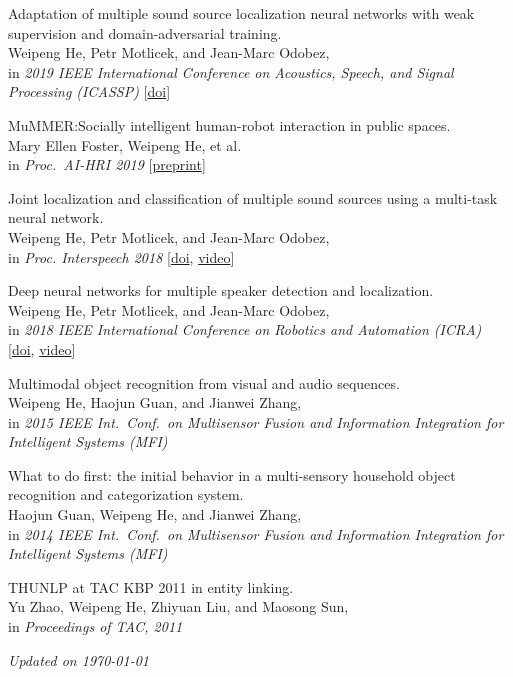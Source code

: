 \documentclass[a4paper,9pt]{extarticle} %
\begin{document}
\begin{enumerate}[label={[\arabic*]}]
  \item Adaptation of multiple sound source localization neural networks with weak supervision and domain-adversarial training. \\
        Weipeng He, Petr Motlicek, and Jean-Marc Odobez, \\
        in \textit{2019 IEEE International Conference on Acoustics, Speech, and Signal Processing (ICASSP)}
        [\href{https://doi.org/10.1109/ICASSP.2019.8682655}{doi}]

  \item MuMMER:\@ Socially intelligent human-robot interaction in public spaces. \\
        Mary Ellen Foster, Weipeng He, et al. \\
        in \textit{Proc.\ AI-HRI 2019}
        [\href{https://arxiv.org/abs/1909.06749}{preprint}]

  \item Joint localization and classification of multiple sound sources using a multi-task neural network. \\
        Weipeng He, Petr Motlicek, and Jean-Marc Odobez, \\
        in \textit{Proc. Interspeech 2018}
        [\href{http://doi.org/10.21437/Interspeech.2018-1269}{doi}, \href{https://www.youtube.com/watch?v=O7bQvg03RTc}{video}]

  \item Deep neural networks for multiple speaker detection and localization. \\
        Weipeng He, Petr Motlicek, and Jean-Marc Odobez, \\
        in \textit{2018 IEEE International Conference on Robotics and Automation (ICRA)}
        [\href{http://doi.org/10.1109/ICRA.2018.8461267}{doi}, \href{https://www.youtube.com/watch?v=_4EwuVlE_pU}{video}]

  \item Multimodal object recognition from visual and audio sequences. \\
        Weipeng He, Haojun Guan, and Jianwei Zhang, \\
        in \textit{2015 IEEE Int.\ Conf.\ on Multisensor Fusion and Information Integration for Intelligent Systems (MFI)}

  \item What to do first: the initial behavior in a multi-sensory household object recognition and categorization system. \\
        Haojun Guan, Weipeng He, and Jianwei Zhang, \\
        in \textit{2014 IEEE Int.\ Conf.\ on Multisensor Fusion and Information Integration for Intelligent Systems (MFI)}

  \item THUNLP at TAC KBP 2011 in entity linking. \\
        Yu Zhao, Weipeng He, Zhiyuan Liu, and Maosong Sun, \\
        in \textit{Proceedings of TAC, 2011}
\end{enumerate}


\vfill
\centering \footnotesize \itshape{Updated on \today}
\end{document}
